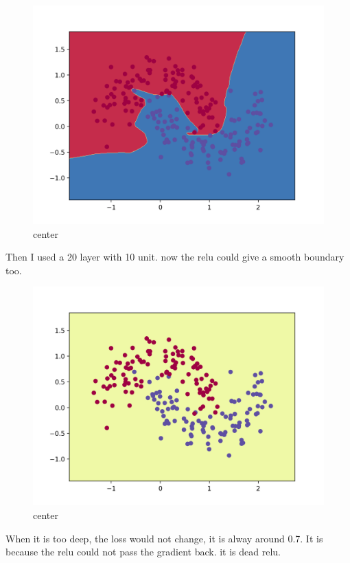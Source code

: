 \documentclass[12pt]{article}
\begin{document}
\begin{figure}[H]
  \caption{center}
  \centering
    \includegraphics[scale=0.2]{20layer10relu.png}
\end{figure}
Then I used a 20 layer with 10 unit. now the relu could give a smooth boundary too.
\begin{figure}[H]
  \caption{center}
  \centering
    \includegraphics[scale=0.2]{deep.png}
\end{figure}
When it is too deep, the loss would not change, it is alway around 0.7. It is because the relu could not pass the gradient back. it is dead relu.
\end{document}
